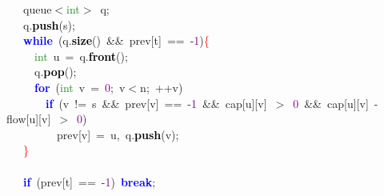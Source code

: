 {{\mbox{}\ \ \ \ queue\textcolor{BrickRed}{$<$}\textcolor{ForestGreen}{int}\textcolor{BrickRed}{$>$}\ q\textcolor{BrickRed}{;} \\
\mbox{}\ \ \ \ q\textcolor{BrickRed}{.}\textbf{\textcolor{Black}{push}}\textcolor{BrickRed}{(}s\textcolor{BrickRed}{);} \\
\mbox{}\ \ \ \ \textbf{\textcolor{Blue}{while}}\ \textcolor{BrickRed}{(}q\textcolor{BrickRed}{.}\textbf{\textcolor{Black}{size}}\textcolor{BrickRed}{()}\ \textcolor{BrickRed}{\&\&}\ prev\textcolor{BrickRed}{[}t\textcolor{BrickRed}{]}\ \textcolor{BrickRed}{==}\ \textcolor{BrickRed}{-}\textcolor{Purple}{1}\textcolor{BrickRed}{)}\textcolor{Red}{\{} \\
\mbox{}\ \ \ \ \ \ \textcolor{ForestGreen}{int}\ u\ \textcolor{BrickRed}{=}\ q\textcolor{BrickRed}{.}\textbf{\textcolor{Black}{front}}\textcolor{BrickRed}{();} \\
\mbox{}\ \ \ \ \ \ q\textcolor{BrickRed}{.}\textbf{\textcolor{Black}{pop}}\textcolor{BrickRed}{();} \\
\mbox{}\ \ \ \ \ \ \textbf{\textcolor{Blue}{for}}\ \textcolor{BrickRed}{(}\textcolor{ForestGreen}{int}\ v\ \textcolor{BrickRed}{=}\ \textcolor{Purple}{0}\textcolor{BrickRed}{;}\ v\textcolor{BrickRed}{$<$}n\textcolor{BrickRed}{;}\ \textcolor{BrickRed}{++}v\textcolor{BrickRed}{)} \\
\mbox{}\ \ \ \ \ \ \ \ \textbf{\textcolor{Blue}{if}}\ \textcolor{BrickRed}{(}v\ \textcolor{BrickRed}{!=}\ s\ \textcolor{BrickRed}{\&\&}\ prev\textcolor{BrickRed}{[}v\textcolor{BrickRed}{]}\ \textcolor{BrickRed}{==}\ \textcolor{BrickRed}{-}\textcolor{Purple}{1}\ \textcolor{BrickRed}{\&\&}\ cap\textcolor{BrickRed}{[}u\textcolor{BrickRed}{][}v\textcolor{BrickRed}{]}\ \textcolor{BrickRed}{$>$}\ \textcolor{Purple}{0}\ \textcolor{BrickRed}{\&\&}\ cap\textcolor{BrickRed}{[}u\textcolor{BrickRed}{][}v\textcolor{BrickRed}{]}\ \textcolor{BrickRed}{-}\ flow\textcolor{BrickRed}{[}u\textcolor{BrickRed}{][}v\textcolor{BrickRed}{]}\ \textcolor{BrickRed}{$>$}\ \textcolor{Purple}{0}\textcolor{BrickRed}{)} \\
\mbox{}\ \ \ \ \ \ \ \ \ \ prev\textcolor{BrickRed}{[}v\textcolor{BrickRed}{]}\ \textcolor{BrickRed}{=}\ u\textcolor{BrickRed}{,}\ q\textcolor{BrickRed}{.}\textbf{\textcolor{Black}{push}}\textcolor{BrickRed}{(}v\textcolor{BrickRed}{);} \\
\mbox{}\ \ \ \ \textcolor{Red}{\}} \\
\mbox{} \\
\mbox{}\ \ \ \ \textbf{\textcolor{Blue}{if}}\ \textcolor{BrickRed}{(}prev\textcolor{BrickRed}{[}t\textcolor{BrickRed}{]}\ \textcolor{BrickRed}{==}\ \textcolor{BrickRed}{-}\textcolor{Purple}{1}\textcolor{BrickRed}{)}\ \textbf{\textcolor{Blue}{break}}\textcolor{BrickRed}{;} \\
}}
